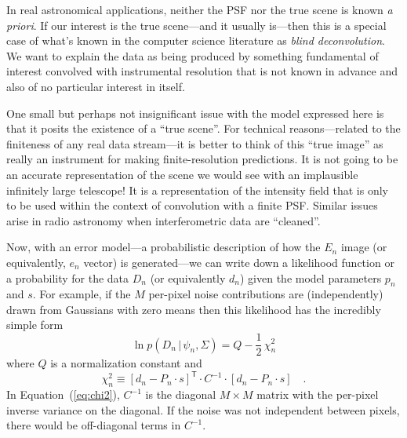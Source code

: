 \documentclass[12pt,preprint]{aastex}
\newcommand{\foreign}[1]{\emph{#1}}
\newcommand{\Eq}[1]{Equation~(\ref{eq:#1})}
\newcommand{\eq}[1]{\Eq{#1}}
\newcommand{\eqlabel}[1]{\label{eq:#1}}
\newcommand{\given}{\,|\,}
\newcommand{\transpose}[1]{{#1}^{\mathsf{T}}}
\newcommand{\data}{\ensuremath{D}}
\newcommand{\scene}{\ensuremath{\Sigma}}
\newcommand{\psf}{\ensuremath{\psi}}
\newcommand{\dvec}{\ensuremath{d}}
\newcommand{\evec}{\ensuremath{e}}
\newcommand{\svec}{\ensuremath{s}}
\newcommand{\pvec}{\ensuremath{p}}
\begin{document}
In real astronomical applications, neither the PSF nor the true scene
is known \foreign{a priori}. If our interest is the true scene---and
it usually is---then this is a special case of what's known in
the computer science literature as \emph{blind deconvolution}. We
want to explain the data as being produced by something fundamental of
interest convolved with instrumental resolution that is not known in
advance and also of no particular interest in itself.

One small but perhaps not insignificant issue with the model expressed
here is that it posits the existence of a ``true scene''.  For
technical reasons---related to the finiteness of any real data
stream---it is better to think of this ``true image'' as really an
instrument for making finite-resolution predictions.  It is not going
to be an accurate representation of the scene we would see with an
implausible infinitely large telescope!  It is a representation of the
intensity field that is only to be used within the context of
convolution with a finite PSF\@.  Similar issues arise in radio astronomy
when interferometric data are ``cleaned''.

Now, with an error model---a probabilistic description of how the
$E_n$ image (or equivalently, $\evec_n$ vector) is generated---we can
write down a likelihood function or a probability for the data $\data_n$
(or equivalently $\dvec_n$) given the model parameters $\pvec_n$ and
$\svec$.  For example, if the $M$ per-pixel noise contributions are
(independently) drawn from Gaussians with zero means then this likelihood
has the incredibly simple form
\begin{equation}\eqlabel{lnlike}
\ln p(\data_n \given \psf_n, \scene) = Q - \frac{1}{2}\,\chi^2_n
\end{equation}
where $Q$ is a normalization constant and
\begin{equation}\eqlabel{chi2}
    \chi^2_n \equiv \transpose{[d_n - P_n \cdot s]} \cdot C^{-1}
    \cdot [d_n - P_n \cdot s] \quad.
\end{equation}
In \eq{chi2}, $C^{-1}$ is the diagonal $M \times M$
matrix with the per-pixel inverse variance on the diagonal. If the
noise was not independent between pixels, there would be off-diagonal
terms in $C^{-1}$.
\end{document}
